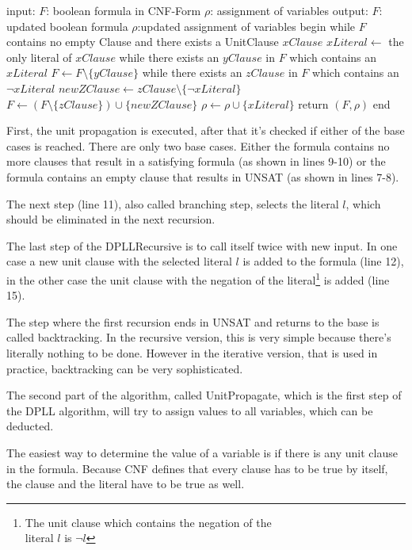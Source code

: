 \begin{algorithm}[caption={UnitPropagate}, label={algUnitProgagate}]
 input: $F$: boolean formula in CNF-Form
	$\rho$: assignment of variables
 output: $F$: updated boolean formula
	$\rho$:updated assignment of variables
 begin
   while $F$ contains no empty Clause
   and there exists a UnitClause $xClause$
       $xLiteral \gets$ the only literal of $xClause$
       while there exists an $yClause$ in $F$
       which contains an $xLiteral$
           $F \gets F \setminus \{yClause\}$     
       while there exists an $zClause$ in $F$
       which contains an $\lnot xLiteral$
           $newZClause \gets zClause \setminus \{\lnot xLiteral\}$
           $F \gets (F \setminus \{zClause\}) \cup \{newZClause\}$
       $\rho \gets \rho \cup \{xLiteral\}$
   return $(F, \rho)$
 end
\end{algorithm}


First, the unit propagation is executed, after that it's checked if either of the base cases is reached. 
There are only two base cases. Either the formula contains no more clauses that result in a satisfying formula (as shown in lines 9-10) or the formula contains an empty clause that results in UNSAT (as shown in lines 7-8).

The next step (line 11), also called branching step, selects the literal $l$, which should be eliminated in the next recursion.

The last step of the DPLLRecursive is to call itself twice with new input. In one case a new unit clause with the selected literal $l$ is added to the formula (line 12), in the other case the unit clause with the negation of the literal\footnote{The unit clause which contains the negation of the \\ literal $l$ is $\lnot l$} is added (line 15).

The step where the first recursion ends in UNSAT and returns to the base is called backtracking. In the recursive version, this is very simple because there's literally nothing to be done. However in the iterative version, that is used in practice, backtracking can be very sophisticated.

The second part of the algorithm, called UnitPropagate, which is the first step of the DPLL algorithm, will try to assign values to all variables, which can be deducted.

The easiest way to determine the value of a variable is if there is any unit clause in the formula. Because CNF defines that every clause has to be true by itself, the clause and the literal have to be true as well.

